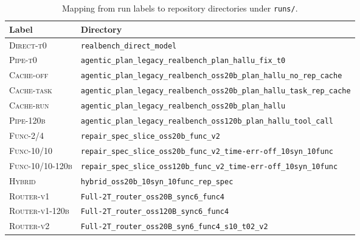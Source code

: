 \begin{table}[htbp]
  \centering
  \caption[Run labels to repository directories]{Mapping from run labels to
    repository directories under \texttt{runs/}.}
  \label{tab:run-dirs}
  \footnotesize
  \begin{tabular}{ll}
    \toprule
    Label & Directory \\
    \midrule
    \textsc{Direct-t0}   & \texttt{realbench\_direct\_model} \\
    \textsc{Pipe-t0}     & \texttt{agentic\_plan\_legacy\_realbench\_plan\_hallu\_fix\_t0} \\
    \textsc{Cache-off}   & \texttt{agentic\_plan\_legacy\_realbench\_oss20b\_plan\_hallu\_no\_rep\_cache} \\
    \textsc{Cache-task}  & \texttt{agentic\_plan\_legacy\_realbench\_oss20b\_plan\_hallu\_task\_rep\_cache} \\
    \textsc{Cache-run}   & \texttt{agentic\_plan\_legacy\_realbench\_oss20b\_plan\_hallu} \\
    \textsc{Pipe-120b}   & \texttt{agentic\_plan\_legacy\_realbench\_oss120b\_plan\_hallu\_tool\_call} \\
    \textsc{Func-2/4}    & \texttt{repair\_spec\_slice\_oss20b\_func\_v2} \\
    \textsc{Func-10/10}  & \texttt{repair\_spec\_slice\_oss20b\_func\_v2\_time-err-off\_10syn\_10func} \\
    \textsc{Func-10/10-120b} & \texttt{repair\_spec\_slice\_oss120b\_func\_v2\_time-err-off\_10syn\_10func} \\
    \textsc{Hybrid}      & \texttt{hybrid\_oss20b\_10syn\_10func\_rep\_spec} \\
    \textsc{Router-v1}   & \texttt{Full-2T\_router\_oss20B\_sync6\_func4} \\
    \textsc{Router-v1-120b} & \texttt{Full-2T\_router\_oss120B\_sync6\_func4} \\
    \textsc{Router-v2}   & \texttt{Full-2T\_router\_oss20B\_syn6\_func4\_s10\_t02\_v2} \\
    \bottomrule
  \end{tabular}
\end{table}

